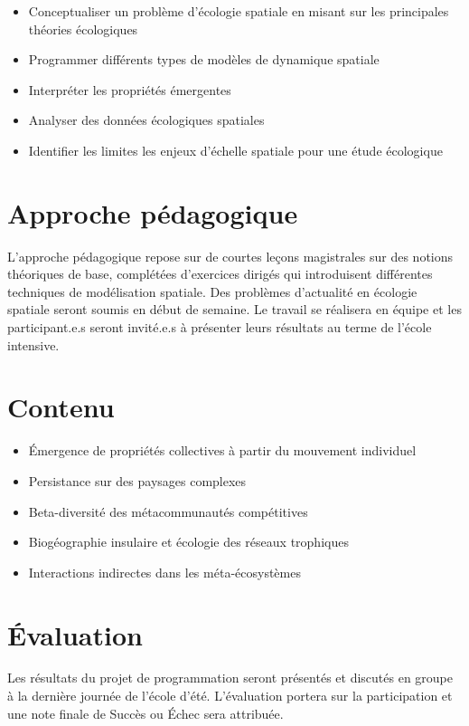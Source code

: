 \documentclass[12]{article}
\begin{document}
	\begin{itemize}
	\renewcommand{\labelitemi}{$\bullet$}

		\item Conceptualiser un problème d'écologie spatiale en misant sur les principales théories écologiques

		\item Programmer différents types de modèles de dynamique spatiale

		\item Interpréter les propriétés émergentes 

		\item Analyser des données écologiques spatiales

		\item Identifier les limites les enjeux d'échelle spatiale pour une étude écologique

	\end{itemize}


  \section*{Approche pédagogique}

  L'approche pédagogique repose sur de courtes leçons magistrales sur des notions théoriques de base, complétées d'exercices dirigés qui introduisent différentes techniques de modélisation spatiale. Des problèmes d'actualité en écologie spatiale seront soumis en début de semaine. Le travail se réalisera en équipe et les participant.e.s seront invité.e.s à présenter leurs résultats au terme de l'école intensive. 
  
	\section*{Contenu}

    \begin{itemize}

        \item[Jour 1] Émergence de propriétés collectives à partir du mouvement individuel
		\item[Jour 2] Persistance sur des paysages complexes
		\item[Jour 3] Beta-diversité des métacommunautés compétitives
		\item[Jour 4] Biogéographie insulaire et écologie des réseaux trophiques
		\item[Jour 5] Interactions indirectes dans les méta-écosystèmes

    \end{itemize}


	\section*{Évaluation}

	Les résultats du projet de programmation seront présentés et discutés en groupe à la dernière journée de l'école d'été. 
	L'évaluation portera sur la participation et une note finale de Succès ou Échec sera attribuée. 
\end{document}
